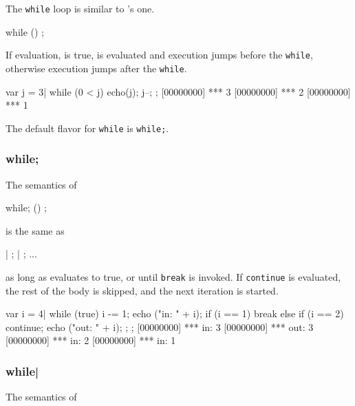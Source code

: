 The \lstinline|while| loop is similar to \C's one.

\begin{urbiunchecked}
while ()
  ;
\end{urbiunchecked}

If  evaluation, is true,  is evaluated and
execution jumps before the \lstinline|while|, otherwise execution
jumps after the \lstinline|while|.

\begin{urbiscript}[firstnumber=last]
var j = 3|
while (0 < j)
{
  echo(j);
  j--;
};
[00000000] *** 3
[00000000] *** 2
[00000000] *** 1
\end{urbiscript}

The default flavor for \lstinline|while| is \lstinline|while;|.

\subsubsection{while;}

The semantics of

\begin{urbiunchecked}
while; ()
  ;
\end{urbiunchecked}

\noindent
is the same as

\begin{urbiunchecked}
 |  ;  |  ; ...
\end{urbiunchecked}

\noindent
as long as  evaluates to true, or until \lstinline|break| is
invoked.  If \lstinline|continue| is evaluated, the rest of the body
is skipped, and the next iteration is started.

\begin{urbiscript}[firstnumber=last]
{
  var i = 4|
  while (true)
  {
    i -= 1;
    echo ("in: " + i);
    if (i == 1)
      break
    else if (i == 2)
      continue;
    echo ("out: " + i);
  };
};
[00000000] *** in: 3
[00000000] *** out: 3
[00000000] *** in: 2
[00000000] *** in: 1
\end{urbiscript}


\subsubsection{while|}

The semantics of

